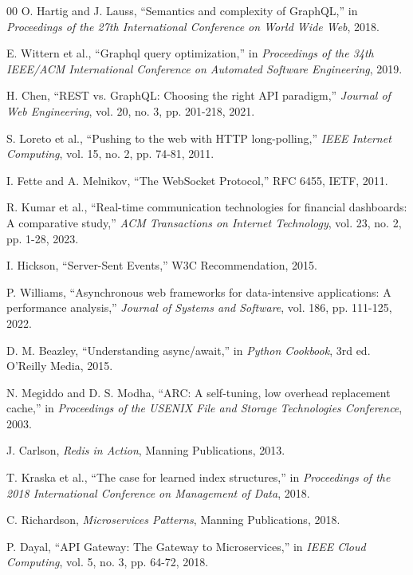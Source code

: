 \documentclass[conference]{IEEEtran}
\begin{document}
\begin{enumerate}
\begin{thebibliography}{00}
 O. Hartig and J. Lauss, ``Semantics and complexity of GraphQL,'' in \textit{Proceedings of the 27th International Conference on World Wide Web}, 2018.

 E. Wittern et al., ``Graphql query optimization,'' in \textit{Proceedings of the 34th IEEE/ACM International Conference on Automated Software Engineering}, 2019.

 H. Chen, ``REST vs. GraphQL: Choosing the right API paradigm,'' \textit{Journal of Web Engineering}, vol. 20, no. 3, pp. 201-218, 2021.

 S. Loreto et al., ``Pushing to the web with HTTP long-polling,'' \textit{IEEE Internet Computing}, vol. 15, no. 2, pp. 74-81, 2011.

 I. Fette and A. Melnikov, ``The WebSocket Protocol,'' RFC 6455, IETF, 2011.

 R. Kumar et al., ``Real-time communication technologies for financial dashboards: A comparative study,'' \textit{ACM Transactions on Internet Technology}, vol. 23, no. 2, pp. 1-28, 2023.

 I. Hickson, ``Server-Sent Events,'' W3C Recommendation, 2015.

 P. Williams, ``Asynchronous web frameworks for data-intensive applications: A performance analysis,'' \textit{Journal of Systems and Software}, vol. 186, pp. 111-125, 2022.

 D. M. Beazley, ``Understanding async/await,'' in \textit{Python Cookbook}, 3rd ed. O'Reilly Media, 2015.

 N. Megiddo and D. S. Modha, ``ARC: A self-tuning, low overhead replacement cache,'' in \textit{Proceedings of the USENIX File and Storage Technologies Conference}, 2003.

 J. Carlson, \textit{Redis in Action}, Manning Publications, 2013.

 T. Kraska et al., ``The case for learned index structures,'' in \textit{Proceedings of the 2018 International Conference on Management of Data}, 2018.

 C. Richardson, \textit{Microservices Patterns}, Manning Publications, 2018.

 P. Dayal, ``API Gateway: The Gateway to Microservices,'' in \textit{IEEE Cloud Computing}, vol. 5, no. 3, pp. 64-72, 2018.


\end{thebibliography}
\end{enumerate}
\end{document}
